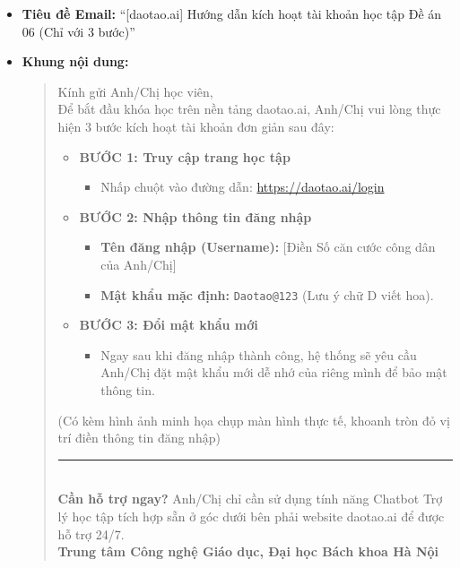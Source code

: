 \begin{itemize}
    \item \textbf{Tiêu đề Email:} ``[daotao.ai] Hướng dẫn kích hoạt tài khoản học tập Đề án 06 (Chỉ với 3 bước)''
    \item \textbf{Khung nội dung:}
    \begin{quote}
        Kính gửi Anh/Chị học viên,\\
        
        Để bắt đầu khóa học trên nền tảng daotao.ai, Anh/Chị vui lòng thực hiện 3 bước kích hoạt tài khoản đơn giản sau đây:
        \begin{itemize}
            \item \textbf{BƯỚC 1: Truy cập trang học tập}
            \begin{itemize}
                \item Nhấp chuột vào đường dẫn: \url{https://daotao.ai/login}
            \end{itemize}
            \item \textbf{BƯỚC 2: Nhập thông tin đăng nhập}
            \begin{itemize}
                \item \textbf{Tên đăng nhập (Username):} [Điền Số căn cước công dân của Anh/Chị]
                \item \textbf{Mật khẩu mặc định:} \texttt{Daotao@123} (Lưu ý chữ D viết hoa).
            \end{itemize}
            \item \textbf{BƯỚC 3: Đổi mật khẩu mới}
            \begin{itemize}
                \item Ngay sau khi đăng nhập thành công, hệ thống sẽ yêu cầu Anh/Chị đặt mật khẩu mới dễ nhớ của riêng mình để bảo mật thông tin.
            \end{itemize}
        \end{itemize}
        (Có kèm hình ảnh minh họa chụp màn hình thực tế, khoanh tròn đỏ vị trí điền thông tin đăng nhập)\\
        \noindent\rule{\linewidth}{0.4pt}\\
        \textbf{Cần hỗ trợ ngay?} Anh/Chị chỉ cần sử dụng tính năng Chatbot Trợ lý học tập tích hợp sẵn ở góc dưới bên phải website daotao.ai để được hỗ trợ 24/7.\\
        
        \textbf{Trung tâm Công nghệ Giáo dục, Đại học Bách khoa Hà Nội}
    \end{quote}
\end{itemize}

